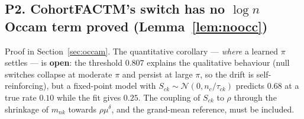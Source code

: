 \documentclass[11pt,a4paper]{article}
\newcommand{\N}{\mathcal{N}}
\theoremstyle{definition}
\theoremstyle{remark}
\begin{document}
\subsection*{P2. CohortFACTM's switch has no $\log n$ Occam term \hfill\textbf{proved} (Lemma~\ref{lem:noocc})}
Proof in Section~\ref{sec:occam}. The quantitative corollary --- \emph{where} a learned $\pi$ settles --- is
\textbf{open}: the threshold $0.807$ explains the qualitative behaviour (null switches collapse at moderate $\pi$ and
persist at large $\pi$, so the drift is self-reinforcing), but a fixed-point model with $S_{ck}\sim\N(0,n_c/\tau_{ck})$
predicts $0.68$ at a true rate $0.10$ while the fit gives $0.25$. The coupling of $S_{ck}$ to $\rho$ through the shrinkage of
$m_{nk}$ towards $\rho\mu^\delta$, and the grand-mean reference, must be included.
\end{document}
